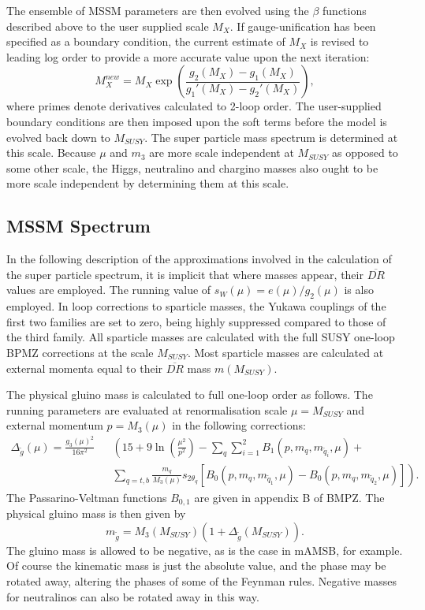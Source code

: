 \documentclass{article}
\begin{document}
The ensemble of MSSM parameters are then evolved using the $\beta$ functions
described above to the user supplied scale $M_X$. 
If gauge-unification has been specified as a boundary condition, the current
estimate of $M_X$ is revised to leading log order 
to provide a more accurate value upon
the next iteration:
\begin{equation}
M_X^{new} = M_X \exp \left({\frac{g_2(M_X) - g_1(M_X)}{g_1'(M_X) - g_2'(M_X)}}\right),
\label{mguteq}
\end{equation}
where primes denote derivatives calculated to 2-loop order.
The user-supplied boundary
conditions are then imposed upon the soft terms before the model is evolved
back down to $M_{SUSY}$. The super particle mass spectrum is determined at this
scale. Because $\mu$ and $m_3$ are 
more scale independent at $M_{SUSY}$ as opposed to some other scale, the Higgs,
neutralino and chargino masses also ought to be more scale independent 
by determining them at this scale. 

\subsection{MSSM Spectrum}

In the following description of the approximations involved in the calculation
of the super particle spectrum, it is implicit that where masses
appear, their $\overline{DR}$ values 
are employed. The running value of
$s_W(\mu)=e(\mu) / g_2(\mu)$ is also employed.
In loop corrections to sparticle masses, the Yukawa couplings of the first two
families are set to zero, being highly suppressed compared to those of the
third family. 
All sparticle masses are calculated with the full SUSY one-loop BPMZ
corrections at the scale $M_{SUSY}$. Most sparticle masses are
calculated at external momenta equal to their $\overline{DR}$ mass
$m(M_{SUSY})$. 

The physical gluino mass is calculated to full one-loop order as follows.
The running parameters are evaluated at renormalisation scale 
$\mu=M_{SUSY}$ and external momentum 
$p=M_3(\mu)$ in the following corrections:
\begin{eqnarray}
\Delta_{\tilde g} (\mu) = \frac{g_3(\mu)^2}{16 \pi^2} &&
\left( 15 + 9 \ln \left( \frac{\mu^2}{p^2} \right) - \sum_q \sum_{i=1}^2
B_1(p, m_q, m_{\tilde q_i}, \mu) + \right. \nonumber \\
&& \left. 
\sum_{q=t,b} \frac{m_q}{M_3(\mu)} s_{2 \theta_q} \left[ B_0(p, m_q, m_{\tilde
q_1}, \mu) - 
B_0(p, m_q, m_{\tilde q_2}, \mu) \right] 
\right).
\end{eqnarray}
The Passarino-Veltman functions $B_{0,1}$ are given in appendix B of BMPZ\@.
The physical gluino mass is then given by
\begin{equation}
m_{\tilde g} = M_3(M_{SUSY}) \left(1 + \Delta_{\tilde g} (M_{SUSY})\right). 
\label{glumass}
\end{equation}
The gluino mass
is allowed to be negative, as is the case in mAMSB, for example. Of course the
kinematic mass is just the absolute value, and the phase may be rotated away,
altering the phases of some of the Feynman rules. Negative masses for
neutralinos can also be rotated away in this way.
\end{document}
